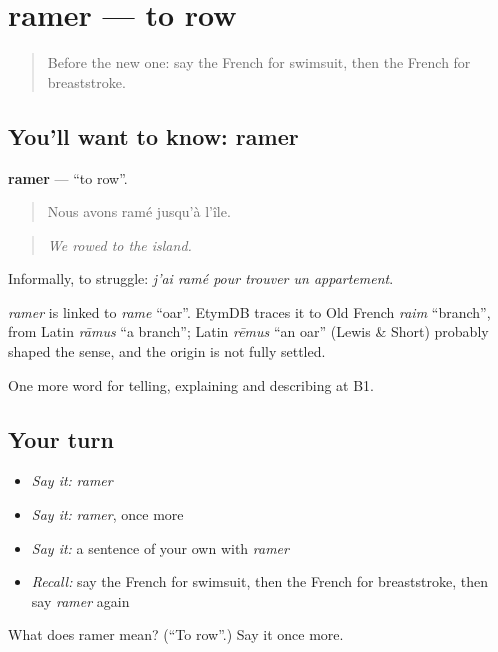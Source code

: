 \section[ramer]{ramer — to row}

\label{lesson:FR-C509-ramer}



\begin{quote}
Before the new one: say the French for swimsuit, then the French for breaststroke.
\end{quote}

\subsection*{You'll want to know: ramer}
\textbf{ramer} — \textquotedblleft{}to row\textquotedblright{}.

\begin{quote}
Nous avons ramé jusqu'à l'île.
\end{quote}

\begin{quote}
\emph{We rowed to the island.}
\end{quote}

Informally, to struggle: \emph{j'ai ramé pour trouver un appartement}.

\begin{cousinweb}
\emph{ramer} is linked to \emph{rame} \textquotedblleft{}oar\textquotedblright{}. EtymDB traces it to Old French \emph{raim} \textquotedblleft{}branch\textquotedblright{}, from Latin \emph{rāmus} \textquotedblleft{}a branch\textquotedblright{}; Latin \emph{rēmus} \textquotedblleft{}an oar\textquotedblright{} (Lewis \& Short) probably shaped the sense, and the origin is not fully settled.
\end{cousinweb}

\begin{grammarlens}[title={What you've built}]
One more word for telling, explaining and describing at B1.
\end{grammarlens}

\subsection*{Your turn}
\begin{itemize}
\raggedright
  \item \emph{Say it:} \emph{ramer}
  \item \emph{Say it:} \emph{ramer}, once more
  \item \emph{Say it:} a sentence of your own with \emph{ramer}
  \item \emph{Recall:} say the French for swimsuit, then the French for breaststroke, then say \emph{ramer} again
\end{itemize}

\begin{tcolorbox}[breakable,colback=teal!4,colframe=teal!35!black,title={Before you move on}]
What does ramer mean? (\textquotedblleft{}To row\textquotedblright{}.) Say it once more.
\end{tcolorbox}
